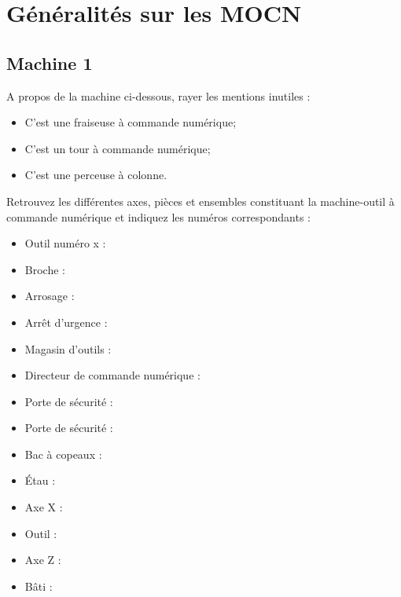 \documentclass[12pt]{article}
\newcounter{exo}
\newenvironment{exo}{\stepcounter{exo}\vspace{0.5cm}{\bfseries Question \theexo\ :}}{\par\vspace{0.5cm}}
\begin{document}
\section{Généralités sur les MOCN}
\subsection{Machine 1}
\begin{exo}\label{exo1} A propos de la machine ci-dessous, rayer les mentions inutiles :
\begin{itemize}
    \item C'est une fraiseuse à commande numérique;
    \item C'est un tour à commande numérique;
    \item C'est une perceuse à colonne.
\end{itemize}
\end{exo}


\begin{exo}\label{exo1} Retrouvez les différentes axes, pièces et ensembles constituant la machine-outil à commande numérique et indiquez les numéros correspondants :\\ \end{exo}
\begin{minipage}{.55\linewidth}
\begin{itemize}
    \item Outil numéro x :
    \item Broche :
    \item Arrosage :
    \item Arrêt d’urgence :
    \item Magasin d’outils :
    \item Directeur de commande numérique :
    \item Porte de sécurité :
\end{itemize}

\end{minipage}
\begin{minipage}{.44\linewidth}
\begin{itemize}
    \item Porte de sécurité :
    \item Bac à copeaux :
    \item Étau :
    \item Axe X :
    \item Outil :
    \item Axe Z :
    \item Bâti :
\end{itemize}
\end{minipage}
\end{document}
